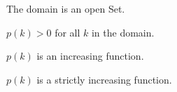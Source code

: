 \documentclass{ximera}
\begin{document}
\begin{exercise}
\begin{question}
The domain is an open Set.
\begin{multipleChoice}
\end{multipleChoice}


\end{question}






\begin{question} 



$p(k) > 0$ for all $k$ in the domain. 
\begin{multipleChoice}
\end{multipleChoice}

\end{question}







\begin{question} 



$p(k)$ is an increasing function.
\begin{multipleChoice}
\end{multipleChoice}

\end{question}





\begin{question} 



$p(k)$ is a strictly increasing function.
\begin{multipleChoice}
\end{multipleChoice}

\end{question}






\end{exercise}
\end{document}
